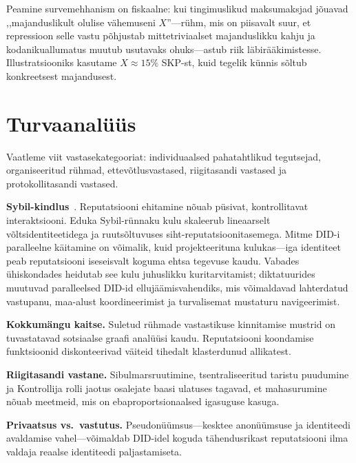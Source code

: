 \documentclass[11pt,a4paper,twocolumn]{article}
\begin{document}
Peamine survemehhanism on fiskaalne: kui tingimuslikud maksumaksjad jõuavad ,,majanduslikult olulise vähemuseni $X$''---rühm, mis on piisavalt suur, et repressioon selle vastu põhjustab mittetriviaalset majanduslikku kahju ja kodanikuallumatus muutub usutavaks ohuks---astub riik läbirääkimistesse. Illustratsiooniks kasutame $X \approx 15\%$ SKP-st, kuid tegelik künnis sõltub konkreetsest majandusest.

\section{Turvaanalüüs}

Vaatleme viit vastasekategooriat: individuaalsed pahatahtlikud tegutsejad, organiseeritud rühmad, ettevõtlusvastased, riigitasandi vastased ja protokollitasandi vastased.

\textbf{Sybil-kindlus}~\cite{douceur2002}. Reputatsiooni ehitamine nõuab püsivat, kontrollitavat interaktsiooni. Eduka Sybil-rünnaku kulu skaleerub lineaarselt võltsidentiteetidega ja ruutsõltuvuses siht-reputatsioonitasemega. Mitme DID-i paralleelne käitamine on võimalik, kuid projekteerituna kulukas---iga identiteet peab reputatsiooni iseseisvalt koguma ehtsa tegevuse kaudu. Vabades ühiskondades heidutab see kulu juhuslikku kuritarvitamist; diktatuurides muutuvad paralleelsed DID-id ellujäämisvahendiks, mis võimaldavad lahterdatud vastupanu, maa-alust koordineerimist ja turvalisemat mustaturu navigeerimist.

\textbf{Kokkumängu kaitse.} Suletud rühmade vastastikuse kinnitamise mustrid on tuvastatavad sotsiaalse graafi analüüsi kaudu. Reputatsiooni koondamise funktsioonid diskonteerivad väiteid tihedalt klasterdunud allikatest.

\textbf{Riigitasandi vastane.} Sibulmarsruutimine, tsentraliseeritud taristu puudumine ja Kontrollija rolli jaotus osalejate baasi ulatuses tagavad, et mahasurumine nõuab meetmeid, mis on ebaproportsionaalsed igasuguse kasuga.

\textbf{Privaatsus vs.\ vastutus.} Pseudonüümsus---kesktee anonüümsuse ja identiteedi avaldamise vahel---võimaldab DID-idel koguda tähendusrikast reputatsiooni ilma valdaja reaalse identiteedi paljastamiseta.

\end{document}
